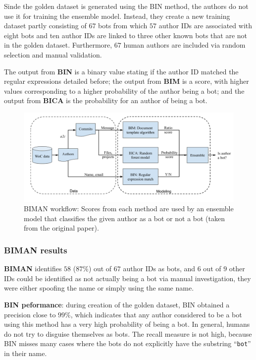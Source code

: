 \documentclass[a4paper, 12pt]{book}
\begin{document}
Sinde the golden dataset is generated using the BIN method, the authors do not use it for training the ensemble model. Instead, they create a new training dataset partly consisting of $67$ bots from which $57$ author IDs are associated with eight bots and ten author IDs are linked to three other known bots that are not in the golden dataset. Furthermore, $67$ human authors are included via random selection and manual validation. 

The output from \textbf{BIN} is a binary value stating if the author ID matched the regular expressions detailed before; the output from \textbf{BIM} is a score, with higher values corresponding to a higher probability of the author being a bot; and the output from \textbf{BICA} is the probability for an author of being a bot.

\begin{figure}
 \centering
  \includegraphics[width=15cm, keepaspectratio]{img/BIMAN-workflow.png}
  \caption{BIMAN workflow: Scores from each method are used by an ensemble model that classifies the given author as a bot or not a bot (taken from the original paper).}
  \label{fig:biman-workflow}
\end{figure}

\subsubsection{BIMAN results}
\label{sssec:dey-results-biman}

\textbf{BIMAN} identifies $58$ ($87\%$) out of $67$ author IDs as bots, and $6$ out of $9$ other IDs could be identified as not actually being a bot via manual investigation, they were either spoofing
the name or simply using the same name. 

\textbf{BIN peformance}:  during creation of the golden dataset, BIN obtained a precision close to $99\%$, which indicates that any author considered to be a bot using this method has a very high probability of being a bot. In general, humans do not try to disguise themselves as bots. The recall measure is not high, because BIN misses many cases where the bots do not explicitly have the substring ``\texttt{bot}'' in their name.
\end{document}
